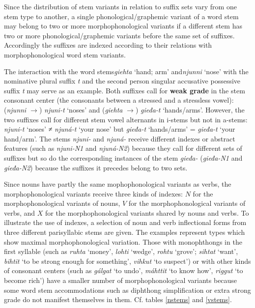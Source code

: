 \documentclass[a4paper,english]{article}
\begin{document}
Since the distribution of stem variants in relation to suffix sets vary from one stem type to another, a single phonological/graphemic variant of a word stem may belong to two or more morphophonological variants if a different stem has two or more phonological/graphemic variants before the same set of suffixes. Accordingly the suffixes are indexed according to their relations with morphophonological word stem variants. 

The interaction with the word stems\textit{giehta} ‘hand; arm’ and\textit{njunni} ‘nose’ with the nominative plural suffix \textit{­t} and the second person singular accusative possessive suffix \textit{­t} may serve as an example. Both suffixes call for \textbf{weak grade} in the stem consonant center (the consonants between a stressed and a stressless vowel): (\textit{njunni $\rightarrow$}) \textit{njuni-t} ‘noses’ and (\textit{giehta} $\rightarrow$)\textit{ gieđa-t} ‘hands/arms’. However, the two suffixes call for different stem vowel alternants in i-stems but not in a-stems: \textit{njuni-t} ‘noses’ ≠ \textit{njuná-t} ‘your nose’ but \textit{gieđa-t} ‘hands/arms’ = \textit{gieđa-t} ‘your hand/arm’. The stems \textit{njuni-} and \textit{njuná-} receive different indexes or abstract features (such as \textit{njuni-N1} and \textit{njuná-N2}) because they call for different sets of suffixes but so do the corresponding instances of the stem \textit{gieđa-} (\textit{gieđa-N1} and \textit{gieđa-N2}) because the suffixes it precedes belong to two sets. 

Since nouns have partly the same mophophonological variants as verbs, the morphophonological variants receive three kinds of indexes: $N$ for the morphophonological variants of nouns, $V$ for the morphophonological variants of verbs, and $X$ for the morphophonological variants shared by nouns and verbs. To illustrate the use of indexes, a selection of noun and verb inflectional forms from three different parisyllabic stems are given. The examples represent types which show maximal morphophonological variation. Those with monophthongs in the first syllable (such as \emph{ruhta} ‘money’, \emph{lohti} ‘wedge’, \emph{rohtu} ‘grove’; \emph{sihtat} ‘want’, \emph{bihtit} ‘to be strong enough for something’, \emph{vihkut} ‘to suspect’) or with other kinds of consonant centers (such as \emph{gálgat} ‘to undo’, \emph{máhttit} ‘to know how’, \emph{riggut} ‘to become rich’) have a smaller number of morphophonological variants because some word stem accommodations such as diphthong simplification or extra strong grade do not manifest themselves in them. Cf. tables \ref{nstems} and \ref{vstems}.
\end{document}
